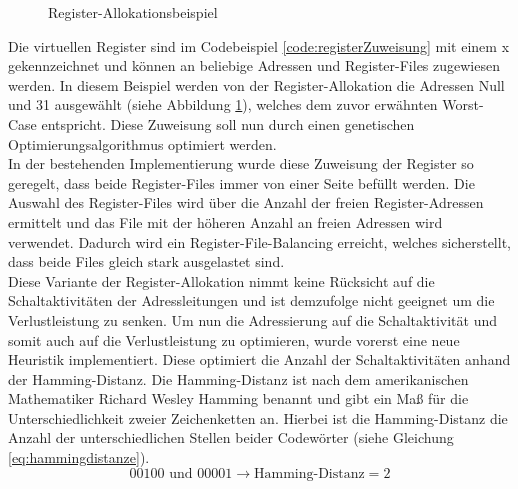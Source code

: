 \begin{figure}[H] 
	\centering
	
	\caption{Register-Allokationsbeispiel}
	\label{fig:register_aloc_example}
\end{figure}
Die virtuellen Register sind im Codebeispiel \ref{code:registerZuweisung} mit einem x gekennzeichnet und können an beliebige Adressen und Register-Files zugewiesen werden. In diesem Beispiel werden von der Register-Allokation die Adressen Null und 31 ausgewählt (siehe Abbildung \ref{fig:register_aloc_example}), welches dem zuvor erwähnten Worst-Case entspricht. Diese Zuweisung soll nun durch einen genetischen Optimierungsalgorithmus optimiert werden.\\
In der bestehenden Implementierung wurde diese Zuweisung der Register so geregelt, dass beide Register-Files immer von einer Seite befüllt werden. Die Auswahl des Register-Files wird über die Anzahl der freien Register-Adressen ermittelt und das File mit der höheren Anzahl an freien Adressen wird verwendet. Dadurch wird ein Register-File-Balancing erreicht, welches sicherstellt, dass beide Files gleich stark ausgelastet sind.\\
Diese Variante der Register-Allokation nimmt keine Rücksicht auf die Schaltaktivitäten der Adressleitungen und ist demzufolge nicht geeignet um die Verlustleistung zu senken.
Um nun die Adressierung auf die Schaltaktivität und somit auch auf die Verlustleistung zu optimieren, wurde vorerst eine neue Heuristik implementiert.
Diese optimiert die Anzahl der Schaltaktivitäten anhand der Hamming-Distanz.
Die Hamming-Distanz ist nach dem amerikanischen Mathematiker Richard Wesley Hamming benannt und gibt ein Maß für die Unterschiedlichkeit zweier Zeichenketten an. Hierbei ist die Hamming-Distanz die Anzahl der unterschiedlichen Stellen beider Codewörter (siehe Gleichung \ref{eq:hammingdistanze}). \cite{hamming1950error}
\begin{equation}
00100 \text{ und } 00001 \rightarrow \text{Hamming-Distanz}= 2
\label{eq:hammingdistanze}
\end{equation}
 
